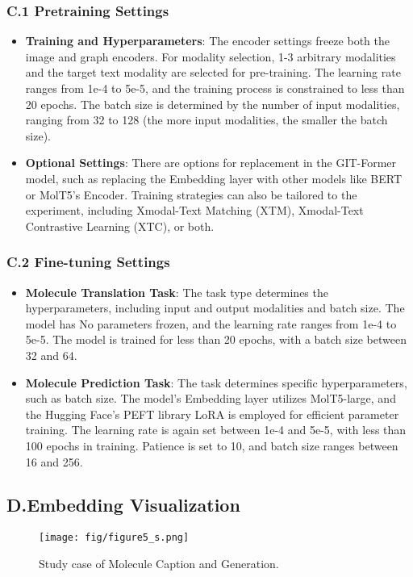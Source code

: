 \documentclass{article}
\begin{document}
\subsubsection*{C.1 Pretraining Settings}
\begin{itemize}
\item \textbf{Training and Hyperparameters}: The encoder settings freeze both the image and graph encoders. For modality selection, 1-3 arbitrary modalities and the target text modality are selected for pre-training. The learning rate ranges from 1e-4 to 5e-5, and the training process is constrained to less than 20 epochs. The batch size is determined by the number of input modalities, ranging from 32 to 128 (the more input modalities, the smaller the batch size).
\item \textbf{Optional Settings}: There are options for replacement in the GIT-Former model, such as replacing the Embedding layer with other models like BERT or MolT5's Encoder. Training strategies can also be tailored to the experiment, including Xmodal-Text Matching (XTM), Xmodal-Text Contrastive Learning (XTC), or both.
\end{itemize}
\subsubsection*{C.2 Fine-tuning Settings}
\begin{itemize}
\item \textbf{Molecule Translation Task}: The task type determines the hyperparameters, including input and output modalities and batch size. The model has No parameters frozen, and the learning rate ranges from 1e-4 to 5e-5. The model is trained for less than 20 epochs, with a batch size between 32 and 64.
\item \textbf{Molecule Prediction Task}: The task determines specific hyperparameters, such as batch size. The model's Embedding layer utilizes MolT5-large, and the Hugging Face's PEFT library LoRA is employed for efficient parameter training. The learning rate is again set between 1e-4 and 5e-5, with less than 100 epochs in training. Patience is set to 10, and batch size ranges between 16 and 256.
\end{itemize}
\subsection*{D.Embedding Visualization}

\begin{figure*}[t!]
\centering
\texttt{[image: fig/figure5\_s.png]}
\caption{Study case of Molecule Caption and Generation.}
\label{fig: Study case}
\end{figure*}
\end{document}
